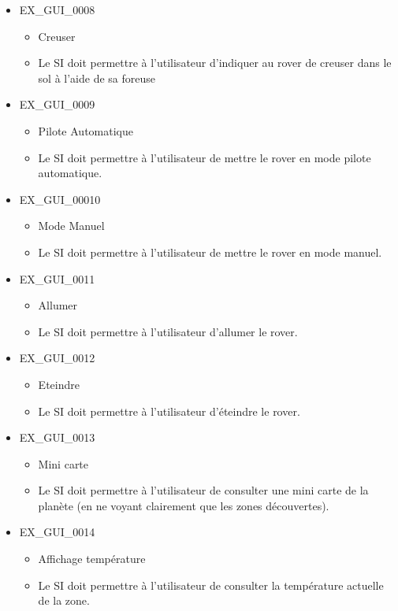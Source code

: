 \documentclass[12pt,a4paper]{scrartcl}
\begin{document}
\begin{itemize}
\item EX\_GUI\_0008
\begin{itemize}
\item Creuser
\item Le SI doit permettre à l'utilisateur d'indiquer au rover de creuser dans
		le sol à l'aide de sa foreuse
\end{itemize}

\item EX\_GUI\_0009
\begin{itemize}
\item Pilote Automatique
\item Le SI doit permettre à l'utilisateur de mettre le rover en mode pilote 
		automatique.
\end{itemize}		

\item EX\_GUI\_00010
\begin{itemize}
\item Mode Manuel
\item Le SI doit permettre à l'utilisateur de mettre le rover en mode manuel.
\end{itemize}
		
\item EX\_GUI\_0011
\begin{itemize}
\item Allumer
\item Le SI doit permettre à l'utilisateur d'allumer le rover.
\end{itemize}

\item EX\_GUI\_0012
\begin{itemize}
\item Eteindre
\item Le SI doit permettre à l'utilisateur d'éteindre le rover.
\end{itemize}

\item EX\_GUI\_0013
\begin{itemize}
\item Mini carte
\item Le SI doit permettre à l'utilisateur de consulter une mini carte de la planète (en ne voyant clairement que les zones découvertes).
\end{itemize}

\item EX\_GUI\_0014
\begin{itemize}
\item Affichage température
\item Le SI doit permettre à l'utilisateur de consulter la température actuelle 
		de la zone.
\end{itemize}

\end{itemize}
\end{document}
